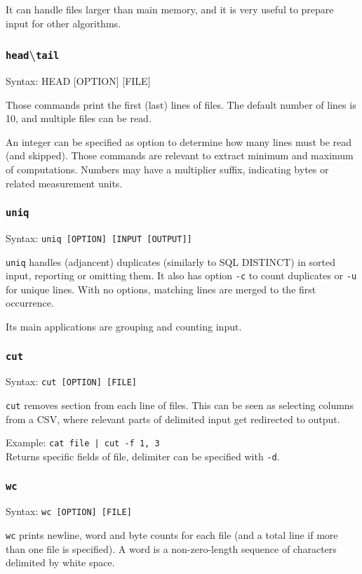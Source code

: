 It can handle files larger than main memory, and it is very useful to prepare input for other algorithms.

\subsubsection{\texttt{head}\textbackslash \texttt{tail}}
Syntax: HEAD [OPTION] [FILE]

Those commands print the first (last) lines of files. The default number of lines is 10, and multiple files can be read. 

An integer can be specified as option to determine how many lines must be read (and skipped). Those commands are relevant to extract minimum and maximum of computations. Numbers may have a multiplier suffix, indicating bytes or related measurement units.

\subsubsection{\texttt{uniq}}
Syntax: \texttt{uniq [OPTION] [INPUT [OUTPUT]]}

\texttt{uniq} handles (adjancent) duplicates (similarly to SQL DISTINCT) in sorted input, reporting or omitting them. It also has option \texttt{-c} to count duplicates or \texttt{-u} for unique lines. With no options, matching lines are merged to the first occurrence.

Its main applications are grouping and counting input.

\subsubsection{\texttt{cut}}
Syntax: \texttt{cut [OPTION] [FILE]}

\texttt{cut} removes section from each line of files. This can be seen as selecting columns from a CSV, where relevant parts of delimited input get redirected to output.

Example: \texttt{cat file | cut -f 1, 3} \\
Returns specific fields of file, delimiter can be specified with \texttt{-d}.

\subsubsection{\texttt{wc}}
Syntax: \texttt{wc [OPTION] [FILE]}

\texttt{wc} prints newline, word and byte counts for each file (and a total line if more than one file is specified). A word is a non-zero-length sequence of characters delimited by white space.

